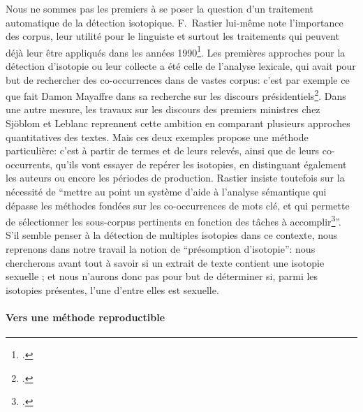 Nous ne sommes pas les premiers à se poser la question d'un traitement automatique de la détection isotopique. F.~Rastier lui-même note l'importance des corpus, leur utilité pour le linguiste et surtout les traitements qui peuvent déjà leur être appliqués dans les années 1990\footcite{rastier_semantique_1996}. Les premières approches pour la détection d'isotopie ou leur collecte %
a été celle de l'analyse lexicale, qui avait pour but de rechercher des co-occurrences dans de vastes corpus: c'est par exemple ce que fait Damon Mayaffre dans sa recherche sur les discours présidentiels\footcite{mayaffre2008occurrence}. Dans une autre mesure, les travaux sur les discours des premiers ministres chez Sjöblom et Leblanc reprennent cette ambition en comparant plusieurs approches quantitatives des textes. Mais ces deux exemples propose une méthode particulière: c'est à partir de termes et de leurs relevés, ainsi que de leurs co-occurrents, qu'ils vont essayer de repérer les isotopies, en distinguant également les auteurs ou encore les périodes de production. %
Rastier insiste toutefois sur la nécessité de \enquote{mettre  au  point  un  système  d’aide à l’analyse  sémantique  qui dépasse les méthodes fondées sur les co-occurrences de mots clé, et qui permette de sélectionner les sous-corpus pertinents en fonction des tâches à accomplir\footcite[p.~31]{rastier_semantique_1996}}. S'il semble penser à la détection de multiples isotopies dans ce contexte, nous reprenons dans notre travail la notion de \enquote{présomption d'isotopie}: nous chercherons avant tout à savoir si un extrait de texte contient une isotopie sexuelle ; et nous n'aurons donc pas pour but de déterminer si, parmi les isotopies présentes, l'une d'entre elles est sexuelle.

\paragraph{Vers une méthode reproductible}



